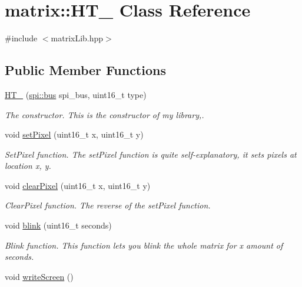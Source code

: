 \hypertarget{classmatrix_1_1_h_t__1632}{}\section{matrix\+:\+:H\+T\+\_ Class Reference}
\label{classmatrix_1_1_h_t__1632}


{\ttfamily \#include $<$matrix\+Lib.\+hpp$>$}

\subsection*{Public Member Functions}
\begin{DoxyCompactItemize}
\item 
\hyperlink{group___h_t__1632_ga6f2a79fd8a1be6e44b847d8548962400}{H\+T\+\_} (\hyperlink{classspi_1_1bus}{spi\+::bus} spi\+\_\+bus, uint16\+\_\+t type)
\begin{DoxyCompactList}\small\item\em The constructor. This is the constructor of my library,. \end{DoxyCompactList}\item 
void \hyperlink{group___h_t__1632_ga41e8cf0207f395b420124b73555abea1}{set\+Pixel} (uint16\+\_\+t x, uint16\+\_\+t y)
\begin{DoxyCompactList}\small\item\em Set\+Pixel function. The set\+Pixel function is quite self-\/explanatory, it sets pixels at location x, y. \end{DoxyCompactList}\item 
void \hyperlink{group___h_t__1632_ga51370333005f486fb0d2877fe459e596}{clear\+Pixel} (uint16\+\_\+t x, uint16\+\_\+t y)
\begin{DoxyCompactList}\small\item\em Clear\+Pixel function. The reverse of the set\+Pixel function. \end{DoxyCompactList}\item 
void \hyperlink{group___h_t__1632_gac1c948d2a7639d54c6cc2a0d6aee0d2f}{blink} (uint16\+\_\+t seconds)
\begin{DoxyCompactList}\small\item\em Blink function. This function lets you blink the whole matrix for x amount of seconds. \end{DoxyCompactList}\item 
void \hyperlink{group___h_t__1632_ga5ed82c4f2f682bcd439aa8a745f01f0f}{write\+Screen} ()

\end{DoxyCompactItemize}
